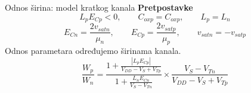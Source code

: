 \begin{frame}[label=09_2-s042]{Odnos širina: model kratkog kanala}
\textbf{Pretpostavke}
\[L_pE_{Cp}<0,\qquad C_{oxp}=C_{oxp},\qquad L_p=L_n\]
\[E_{Cn}=\frac{2v_{satn}}{\mu_n},\qquad E_{Cp}=\frac{2v_{satp}}{\mu_p},\qquad v_{satn}=-v_{satp}\]
Odnos parametara određujemo širinama kanala.
\[\frac{W_p}{W_n}=\frac{1+\frac{|L_pE_{Cp}|}{V_{DD}-V_S+V_{Tp}}}{1+\frac{L_nE_{Cn}}{V_S-V_{Tn}}}\times\frac{V_S-V_{Tn}}{V_{DD}-V_S+V_{Tp}}\]

\end{frame}
